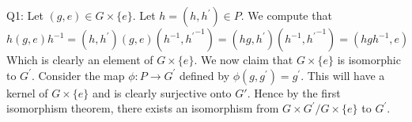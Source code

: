 \documentclass[letterpaper]{article}
\begin{document}
\noindent Q1: Let $(g,e) \in G \times \{e\}$. Let $h = (h, h^\prime)\in P$. We compute that $$h(g,e)h^{-1} = (h,h^\prime)(g,e) (h^{-1},{ h^\prime}^{-1}) = (hg,h^\prime) (h^{-1},{ h^\prime}^{-1}) = (hgh^{-1}, e)$$
Which is clearly an element of $G\times \{e\}$. We now claim that $G \times \{e\}$ is isomorphic to $G^\prime$. Consider the map $\phi:P \to G^\prime$ defined by $\phi(g,g^\prime) = g^\prime$. This will have a kernel of $G \times \{e\}$ and is clearly surjective onto $G\prime$. Hence by the first isomorphism theorem, there exists an isomorphism from $G \times G^\prime / G \times \{e\} $ to $G^\prime$.  
\end{document}
